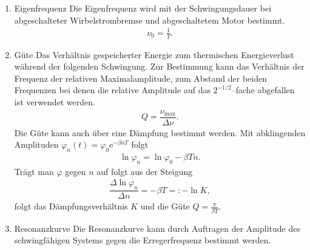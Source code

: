 \begin{enumerate}[label=--]
        \item Eigenfrequenz \hspace{25pt} 
                Die Eigenfrequenz wird mit der Schwingungsdauer bei abgeschalteter Wirbelstrombremse und abgeschaltetem Motor bestimmt.
                \begin{align} 
                        \nu _0=\tfrac{1}{T}
                .\end{align} 
        \item Güte \hspace{25pt} 
                Das Verhältnis gespeicherter Energie zum thermischen Energieverlust während der folgenden Schwingung.
                Zur Bestimmung kann das Verhältnis der Frequenz der relativen Maximalamplitude, zum Abstand der beiden Frequenzen bei denen die relative Amplitude auf das $2^{-1/2}$--fache abgefallen ist verwendet werden.
                \begin{align} 
                        Q=\dfrac{\nu _{\text{max} }}{\Delta \nu }
                .\end{align} 
                Die Güte kann auch über eine Dämpfung bestimmt werden. Mit abklingenden Amplituden $\varphi _n\left(t\right)=\varphi _0\text{e}^{-\beta nT}$ folgt 
                \begin{align} 
                        \ln \varphi _n=\ln \varphi _0-\beta Tn
                .\end{align} 
                Trägt man $\varphi $ gegen $n$ auf folgt aus der Steigung
                \begin{align} 
                        \dfrac{\Delta \ln \varphi _n}{\Delta n}=-\beta T=:-\ln K
                ,\end{align} 
                folgt das Dämpfungsverhältnis $K$ und die Güte $Q=\tfrac{\pi }{\beta T}$.
        \item Resonanzkurve \hspace{25pt} 
                Die Resonanzkurve kann durch Auftragen der Amplitude des schwingfähigen Systems gegen die Erregerfrequenz bestimmt werden.
\end{enumerate}

\newpage

